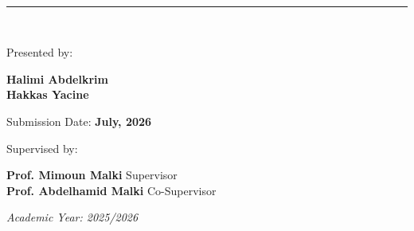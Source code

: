 \begin{titlepage}
\vspace{0.4cm}

\centering
{\textbf{\thesistitle}}\\

\rule{15cm}{0.2mm}\\

\vspace{0.4cm}

\large Presented by:\\

\vspace{0.2cm}

{\large \textbf{Halimi Abdelkrim}}\\
{\large \textbf{Hakkas Yacine}}\\

\vspace{0.45cm}

{\large Submission Date: \textbf{July, 2026}\\}

\vspace{0.3cm}

{\large Supervised by:}

\vspace{0.3cm}

\begin{center}
    {\large \textbf{Prof. Mimoun Malki} \hfill Supervisor\\}
    {\large \textbf{Prof. Abdelhamid Malki} \hfill Co-Supervisor\\}
\end{center}

\vspace{0.5cm}

\normalsize \textit{Academic Year: 2025/2026\\}

\restoregeometry
\end{titlepage}
